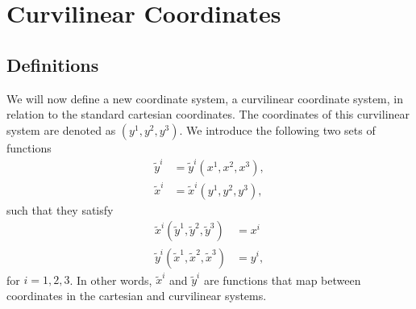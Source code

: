 \documentclass[11pt]{article}
\newcommand{\xtilde}{\tilde{x}}
\newcommand{\ytilde}{\tilde{y}}
\begin{document}
\section{Curvilinear Coordinates}

\subsection{Definitions}
We will now define a new coordinate system, a curvilinear coordinate system, in relation to the standard cartesian coordinates. The coordinates of this curvilinear system are denoted as $(y^1, y^2, y^3)$. We introduce the following two sets of functions
\begin{align}
\ytilde^i &= \ytilde^i(x^1, x^2, x^3), \label{eq:generic_xtoy} \\
\xtilde^i &= \xtilde^i(y^1,y^2,y^3), \label{eq:generic_ytox}
\end{align}
such that they satisfy
\begin{align}
    \xtilde^i(\ytilde^1, \ytilde^2, \ytilde^3) &= x^i \label{eq:trans1}\\
    \ytilde^i(\xtilde^1, \xtilde^2, \xtilde^3) &= y^i \label{eq:trans2},
\end{align}
for $i=1,2,3$. In other words, $\xtilde^i$ and $\ytilde^i$ are functions that map between coordinates in the cartesian and curvilinear systems. 
\end{document}
